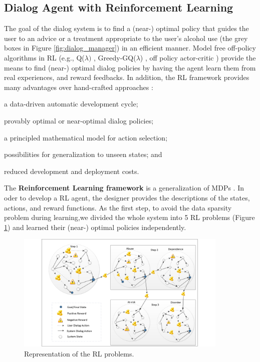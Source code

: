 \documentclass[letterpaper]{article}
\begin{document}
\subsection*{Dialog Agent with Reinforcement Learning}

The goal of the dialog system is to find a (near-) optimal policy that guides the user to an advice 
or a treatment appropriate to the user's alcohol use (the grey boxes in Figure \ref{fig:dialog_manager}) in an efficient manner. 
Model free off-policy algorithms in RL (e.g., Q($\lambda)$ \cite{sutton1998reinforcement}, 
Greedy-GQ($\lambda$) \cite{maei2010toward}, off policy actor-critic \cite{DegrisWS12}) provide the 
means to find (near-) optimal dialog policies by having the agent learn them 
from real experiences, and reward feedbacks. In addition, the RL framework provides many advantages over hand-crafted approaches \cite{lemon2007machine}: \begin{inparaenum}[1)] \item a 
data-driven automatic development cycle; \item provably optimal or near-optimal dialog policies; 
\item  a principled mathematical model for action selection; \item  possibilities for generalization 
to unseen states; and \item reduced development and deployment costs.\end{inparaenum} 

The {\bf Reinforcement Learning framework} is a generalization of MDPs \cite{sutton1998reinforcement}. In oder to develop a RL 
agent, the designer provides the descriptions of the states, actions, and reward functions. As the 
first step, to avoid the data sparsity problem during learning,we
divided  the whole system into 5 RL problems (Figure \ref{fig:5mdpv2}) and learned their 
(near-) optimal policies independently. 

\begin{figure}[!t]
  \centering    
	\includegraphics[width=0.9\textwidth]{figures/5MDPV2}
	\caption{Representation of the RL problems.}
  \label{fig:5mdpv2}
\end{figure}
\end{document}
